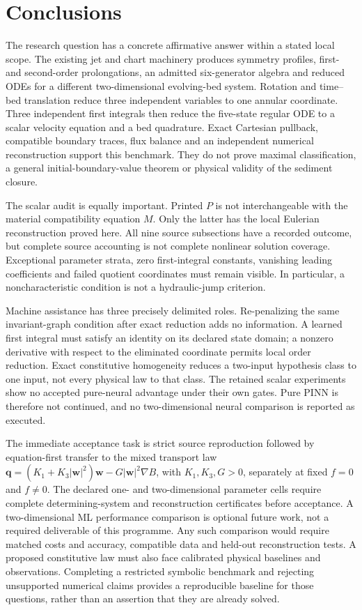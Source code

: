 \documentclass[11pt,a4paper,oneside]{report}
\numberwithin{equation}{chapter}
\begin{document}
\section{Conclusions}
The research question has a concrete affirmative answer within a stated local
scope. The existing jet and chart machinery produces symmetry profiles,
first- and second-order prolongations, an admitted six-generator algebra
and reduced ODEs for a different two-dimensional evolving-bed system.
Rotation and time--bed translation reduce three independent variables to
one annular coordinate. Three independent first integrals then reduce the
five-state regular ODE to a scalar velocity equation and a bed quadrature.
Exact Cartesian pullback, compatible boundary traces, flux balance and an
independent numerical reconstruction support this benchmark. They do not
prove maximal classification, a general initial-boundary-value theorem or
physical validity of the sediment closure.

The scalar audit is equally important. Printed $P$ is not interchangeable
with the material compatibility equation $M$. Only the latter has the local
Eulerian reconstruction proved here. All nine source subsections have a
recorded outcome, but complete source accounting is not complete nonlinear
solution coverage. Exceptional parameter strata, zero first-integral
constants, vanishing leading coefficients and failed quotient coordinates
must remain visible. In particular, a noncharacteristic condition is not
a hydraulic-jump criterion.

Machine assistance has three precisely delimited roles. Re-penalizing the
same invariant-graph condition after exact reduction adds no information.
A learned first integral must satisfy an identity on its declared state
domain; a nonzero derivative with respect to the eliminated coordinate
permits local order reduction. Exact constitutive homogeneity reduces a
two-input hypothesis class to one input, not every physical law to that
class. The retained scalar experiments show no accepted pure-neural
advantage under their own gates. Pure PINN is therefore not continued,
and no two-dimensional neural comparison is reported as executed.

The immediate acceptance task is strict source reproduction followed by
equation-first transfer to the mixed transport law
$\mathbf q=(K_1+K_3|\mathbf w|^2)\mathbf w-G|\mathbf w|^2\nabla B$,
with $K_1,K_3,G>0$, separately at fixed $f=0$ and $f\ne0$.
The declared one- and two-dimensional parameter cells require complete
determining-system and reconstruction certificates before acceptance.
A two-dimensional ML performance comparison is optional future work,
not a required deliverable of this programme. Any such comparison would
require matched costs and accuracy, compatible data and held-out
reconstruction tests. A proposed constitutive law must also face calibrated
physical baselines and observations. Completing a
restricted symbolic benchmark and rejecting unsupported numerical claims
provides a reproducible baseline for those questions, rather than an
assertion that they are already solved.
\end{document}
